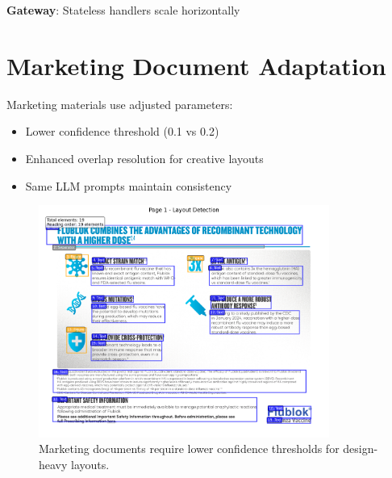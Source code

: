 \documentclass[11pt]{article}
\begin{document}
\textbf{Gateway}: Stateless handlers scale horizontally

\section{Marketing Document Adaptation}

Marketing materials use adjusted parameters:
\begin{itemize}
\item Lower confidence threshold (0.1 vs 0.2)
\item Enhanced overlap resolution for creative layouts
\item Same LLM prompts maintain consistency
\end{itemize}

\begin{figure}[htbp]
\centering
\includegraphics[width=0.85\textwidth]{marketing_layout_example.png}
\caption{Marketing documents require lower confidence thresholds for design-heavy layouts.}
\end{figure}
\end{document}
